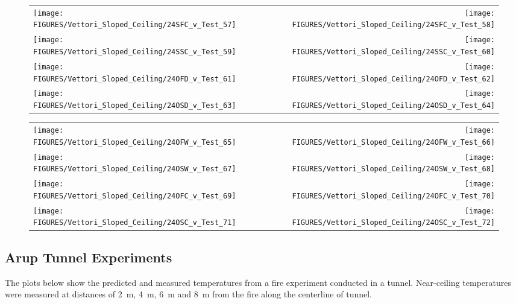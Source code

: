 \begin{figure}[p]
\begin{tabular*}{\textwidth}{l@{\extracolsep{\fill}}r}
\texttt{[image: FIGURES/Vettori\_Sloped\_Ceiling/24SFC\_v\_Test\_57]} &
\texttt{[image: FIGURES/Vettori\_Sloped\_Ceiling/24SFC\_v\_Test\_58]} \\
\texttt{[image: FIGURES/Vettori\_Sloped\_Ceiling/24SSC\_v\_Test\_59]} &
\texttt{[image: FIGURES/Vettori\_Sloped\_Ceiling/24SSC\_v\_Test\_60]} \\
\texttt{[image: FIGURES/Vettori\_Sloped\_Ceiling/24OFD\_v\_Test\_61]} &
\texttt{[image: FIGURES/Vettori\_Sloped\_Ceiling/24OFD\_v\_Test\_62]} \\
\texttt{[image: FIGURES/Vettori\_Sloped\_Ceiling/24OSD\_v\_Test\_63]} &
\texttt{[image: FIGURES/Vettori\_Sloped\_Ceiling/24OSD\_v\_Test\_64]} \\
\end{tabular*}
\label{Vettori_Sloped_8}
\end{figure}

\begin{figure}[p]
\begin{tabular*}{\textwidth}{l@{\extracolsep{\fill}}r}
\texttt{[image: FIGURES/Vettori\_Sloped\_Ceiling/24OFW\_v\_Test\_65]} &
\texttt{[image: FIGURES/Vettori\_Sloped\_Ceiling/24OFW\_v\_Test\_66]} \\
\texttt{[image: FIGURES/Vettori\_Sloped\_Ceiling/24OSW\_v\_Test\_67]} &
\texttt{[image: FIGURES/Vettori\_Sloped\_Ceiling/24OSW\_v\_Test\_68]} \\
\texttt{[image: FIGURES/Vettori\_Sloped\_Ceiling/24OFC\_v\_Test\_69]} &
\texttt{[image: FIGURES/Vettori\_Sloped\_Ceiling/24OFC\_v\_Test\_70]} \\
\texttt{[image: FIGURES/Vettori\_Sloped\_Ceiling/24OSC\_v\_Test\_71]} &
\texttt{[image: FIGURES/Vettori\_Sloped\_Ceiling/24OSC\_v\_Test\_72]} \\
\end{tabular*}
\label{Vettori_Sloped_9}
\end{figure}

\clearpage

\subsection{Arup Tunnel Experiments}

The plots below show the predicted and measured temperatures from a fire experiment conducted in a tunnel. Near-ceiling temperatures
were measured at distances of 2~m, 4~m, 6~m and 8~m from the fire along the centerline of tunnel.

